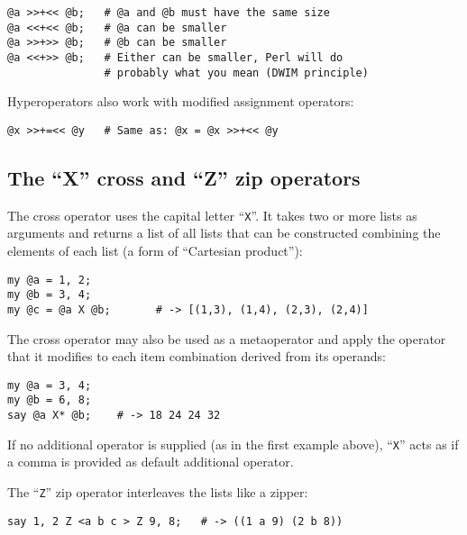 \begin{verbatim}
@a >>+<< @b;   # @a and @b must have the same size
@a <<+<< @b;   # @a can be smaller
@a >>+>> @b;   # @b can be smaller
@a <<+>> @b;   # Either can be smaller, Perl will do 
               # probably what you mean (DWIM principle)
\end{verbatim}

Hyperoperators also work with modified assignment 
operators:

\begin{verbatim}
@x >>+=<< @y   # Same as: @x = @x >>+<< @y
\end{verbatim}

\subsection{The ``X'' cross and ``Z'' zip operators}

The cross operator uses the capital letter ``\verb"X"''.
It takes two or more lists as arguments and returns a list 
of all lists that can be constructed combining the elements 
of each list (a form of ``Cartesian product''):

\begin{verbatim}
my @a = 1, 2;
my @b = 3, 4;
my @c = @a X @b;       # -> [(1,3), (1,4), (2,3), (2,4)]
\end{verbatim}

The cross operator may also be used as a metaoperator and 
apply the operator that it modifies to each item combination 
derived from its operands:

\begin{verbatim}
my @a = 3, 4;
my @b = 6, 8;
say @a X* @b;    # -> 18 24 24 32
\end{verbatim}

If no additional operator is supplied (as in the first 
example above), ``\verb"X"'' acts as if a comma is 
provided as default additional operator. 

The ``\verb"Z"'' zip operator interleaves the lists 
like a zipper:

\begin{verbatim}
say 1, 2 Z <a b c > Z 9, 8;   # -> ((1 a 9) (2 b 8))
\end{verbatim}

